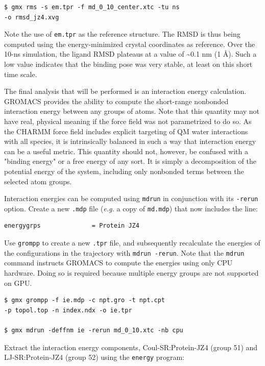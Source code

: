 \documentclass[9pt,tutorial]{livecoms}
\begin{document}
\begin{verbatim}
$ gmx rms -s em.tpr -f md_0_10_center.xtc -tu ns
-o rmsd_jz4.xvg
\end{verbatim}

Note the use of \texttt{em.tpr} as the reference structure. The RMSD is thus being computed using the energy-minimized crystal coordinates as reference. Over the 10-ns simulation, the ligand RMSD plateaus at a value of \textasciitilde0.1 nm (1 \AA). Such a low value indicates that the binding pose was very stable, at least on this short time scale.

The final analysis that will be performed is an interaction energy calculation. GROMACS provides the ability to compute the short-range nonbonded interaction energy between any groups of atoms. Note that this quantity may not have real, physical meaning if the force field was not parametrized to do so. As the CHARMM force field includes explicit targeting of QM water interactions with all species, it is intrinsically balanced in such a way that interaction energy can be a useful metric. This quantity should not, however, be confused with a "binding energy" or a free energy of any sort. It is simply a decomposition of the potential energy of the system, including only nonbonded terms between the selected atom groups.

Interaction energies can be computed using \texttt{mdrun} in conjunction with its \texttt{-rerun} option. Create a new \texttt{.mdp} file ({\em e.g.} a copy of \texttt{md.mdp}) that now includes the line:

\begin{verbatim}
energygrps              = Protein JZ4
\end{verbatim}

Use \texttt{grompp} to create a new \texttt{.tpr} file, and subsequently recalculate the energies of the configurations in the trajectory with \texttt{mdrun -rerun}. Note that the \texttt{mdrun} command instructs GROMACS to compute the energies using only CPU hardware. Doing so is required because multiple energy groups are not supported on GPU.

\begin{verbatim}
$ gmx grompp -f ie.mdp -c npt.gro -t npt.cpt
-p topol.top -n index.ndx -o ie.tpr

$ gmx mdrun -deffnm ie -rerun md_0_10.xtc -nb cpu
\end{verbatim}

Extract the interaction energy components, Coul-SR:Protein-JZ4 (group 51) and LJ-SR:Protein-JZ4 (group 52) using the \texttt{energy} program:
\end{document}
